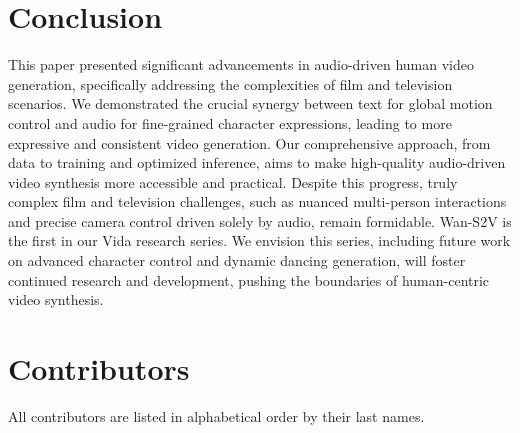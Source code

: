 \documentclass{article} %
\begin{document}
\begin{abstract}
Current state-of-the-art (SOTA) methods for audio-driven character animation demonstrate promising performance for scenarios primarily involving speech and singing. However, they often fall short in more complex film and television productions, which demand sophisticated elements such as nuanced character interactions, realistic body movements, and dynamic camera work.
To address this long-standing challenge of achieving film-level character animation, we propose an audio-driven model, which we refere to as Wan-S2V, built upon Wan. Our model achieves significantly enhanced expressiveness and fidelity in cinematic contexts compared to existing approaches.

We conducted extensive experiments, benchmarking our method against cutting-edge models such as Hunyuan-Avatar and Omnihuman. The experimental results consistently demonstrate that our approach significantly outperforms these existing solutions. Additionally, we explore the versatility of our method through its applications in long-form video generation and precise video lip-sync editing.
\end{abstract}







\section{Conclusion}
This paper presented significant advancements in audio-driven human video generation, specifically addressing the complexities of film and television scenarios. We demonstrated the crucial synergy between text for global motion control and audio for fine-grained character expressions, leading to more expressive and consistent video generation. Our comprehensive approach, from data to training and optimized inference, aims to make high-quality audio-driven video synthesis more accessible and practical. Despite this progress, truly complex film and television challenges, such as nuanced multi-person interactions and precise camera control driven solely by audio, remain formidable. 
Wan-S2V is the first in our Vida research series. We envision this series, including future work on advanced character control and dynamic dancing generation, will foster continued research and development, pushing the boundaries of human-centric video synthesis.

\section{Contributors}
All contributors are listed in alphabetical order by their last names.
\end{document}
